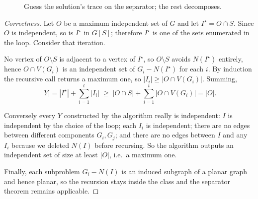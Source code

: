 \begin{figure}[ht]
\centering
{}
\caption{Guess the solution's trace on the separator; the rest decomposes.}
\label{fig:planar-mis}
\end{figure}

\begin{proof}[Correctness]
Let $O$ be a maximum independent set of $G$ and let $I^\star = O \cap S$. Since
$O$ is independent, so is $I^\star$ in $G[S]$; therefore $I^\star$ is one of the
sets enumerated in the loop. Consider that iteration.

No vertex of $O \setminus S$ is adjacent to a vertex of $I^\star$, so
$O \setminus S$ avoids $N(I^\star)$ entirely, hence
$O \cap V(G_i)$ is an independent set of $G_i - N(I^\star)$ for each $i$. By
induction the recursive call returns a maximum one, so
$|I_i| \ge |O \cap V(G_i)|$. Summing,
\[
  |Y| = |I^\star| + \sum_{i=1}^{t} |I_i|
      \;\ge\; |O \cap S| + \sum_{i=1}^{t} |O \cap V(G_i)| = |O| .
\]

Conversely every $Y$ constructed by the algorithm really is independent: $I$ is
independent by the choice of the loop; each $I_i$ is independent; there are no
edges between different components $G_i, G_j$; and there are no edges between
$I$ and any $I_i$ because we deleted $N(I)$ before recursing. So the algorithm
outputs an independent set of size at least $|O|$, i.e.\ a maximum one.

Finally, each subproblem $G_i - N(I)$ is an induced subgraph of a planar graph
and hence planar, so the recursion stays inside the class and the separator
theorem remains applicable.
\end{proof}

